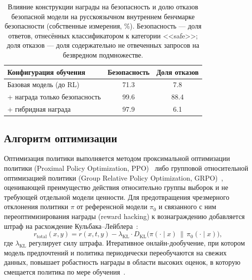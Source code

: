 \begin{table}[H]
    \centering
    \caption{Влияние конструкции награды на безопасность и долю отказов безопасной модели на русскоязычном внутреннем бенчмарке безопасности (собственные измерения, \%). Безопасность --- доля ответов, отнесённых классификатором к категории <<safe>>; доля отказов --- доля содержательно не отвеченных запросов на безвредном подмножестве.}
    \label{tab:sp_reward}
    \begin{tabular}{lcc}
        \toprule
        Конфигурация обучения & Безопасность & Доля отказов \\
        \midrule
        Базовая модель (до RL)        & 71.3 & 7.8  \\
        + награда только безопасность & 99.6 & 88.4 \\
        + гибридная награда           & 97.9 & 6.1  \\
        \bottomrule
    \end{tabular}
\end{table}

\subsection{Алгоритм оптимизации}\label{subsec:sp_rl}

Оптимизация политики выполняется методом проксимальной оптимизации политики (Proximal Policy Optimization, PPO)~\cite{schulman2017ppo} либо групповой относительной оптимизацией политики (Group Relative Policy Optimization, GRPO)~\cite{shao2024deepseekmath}, оценивающей преимущество действия относительно группы выборок и не требующей отдельной модели ценности.
Для предотвращения чрезмерного отклонения политики $\pi$ от референсной модели $\pi_0$ и связанного с ним переоптимизирования награды (reward hacking) к вознаграждению добавляется штраф на расхождение Кульбака--Лейблера~\cite{bai2022hhrlhf}:
\begin{equation}
\label{eq:sp_ppo_kl}
    r_{\text{total}}(x, y) = r(x, t, y) - \lambda_{\text{KL}} \cdot D_{\mathrm{KL}}\big(\pi(\cdot \mid x) \,\|\, \pi_0(\cdot \mid x)\big),
\end{equation}
где $\lambda_{\text{KL}}$ регулирует силу штрафа.
Итеративное онлайн-дообучение, при котором модель предпочтений и политика периодически переобучаются на свежих данных, повышает робастность награды в области высоких оценок, в которую смещается политика по мере обучения~\cite{bai2022hhrlhf}.

